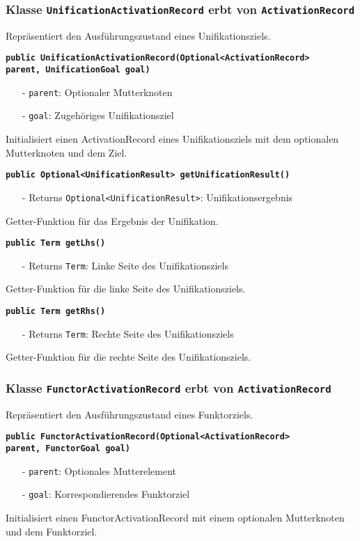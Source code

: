 \documentclass[parskip=full,11pt,twoside]{scrartcl}
\begin{document}
\subsubsection{Klasse \texttt{UnificationActivationRecord} erbt von \texttt{ActivationRecord}}
Repräsentiert den Ausführungszustand eines Unifikationsziels.

\textbf{\texttt{public UnificationActivationRecord(Optional<ActivationRecord>\\ parent, UnificationGoal goal)}}
\begin{itemize}[noitemsep]
	\item[-] \texttt{parent}: Optionaler Mutterknoten
	\item[-] \texttt{goal}: Zugehöriges Unifikationsziel
\end{itemize}
Initialisiert einen ActivationRecord eines Unifikationsziels mit dem optionalen Mutterknoten und dem Ziel.

\textbf{\texttt{public Optional<UnificationResult> getUnificationResult()}}
\begin{itemize}[noitemsep]
	\item[-] Returns \texttt{Optional<UnificationResult>}: Unifikationsergebnis
\end{itemize}
Getter-Funktion für das Ergebnis der Unifikation.

\textbf{\texttt{public Term getLhs()}}
\begin{itemize}[noitemsep]
	\item[-] Returns \texttt{Term}: Linke Seite des Unifikationsziels
\end{itemize}
Getter-Funktion für die linke Seite des Unifikationsziels.

\textbf{\texttt{public Term getRhs()}}
\begin{itemize}[noitemsep]
	\item[-] Returns \texttt{Term}: Rechte Seite des Unifikationsziels
\end{itemize}
Getter-Funktion für die rechte Seite des Unifikationsziels.

\subsubsection{Klasse \texttt{FunctorActivationRecord} erbt von \texttt{ActivationRecord}}

Repräsentiert den Ausführungszustand eines Funktorziels.

\textbf{\texttt{public FunctorActivationRecord(Optional<ActivationRecord>\\ parent, FunctorGoal goal)}}
\begin{itemize}[noitemsep]
	\item[-] \texttt{parent}: Optionales Mutterelement
	\item[-] \texttt{goal}: Korrespondierendes Funktorziel
\end{itemize}
Initialisiert einen FunctorActivationRecord mit einem optionalen Mutterknoten und dem Funktorziel.
\end{document}
